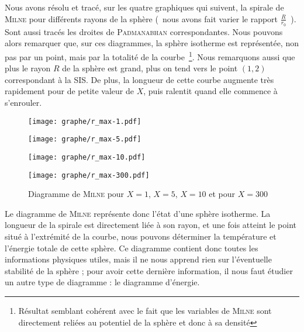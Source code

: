 	Nous avons résolu et tracé, sur les quatre graphiques qui suivent, la spirale de \textsc{Milne} pour différents rayons de la sphère (~nous avons fait varier le rapport $\frac{R}{r_0}$~).
	Sont aussi tracés les droites de \textsc{Padmanabhan} correspondantes.
	Nous pouvons alors remarquer que, sur ces diagrammes, la sphère isotherme est représentée, non pas par un point, mais par la totalité de la courbe~\footnote{Résultat semblant cohérent avec le fait que les variables de \textsc{Milne} sont directement reliées au potentiel de la sphère et donc à sa densité}.
	Nous remarquons aussi que plus le rayon $R$ de la sphère est grand, plus on tend vers le point $(1,2)$ correspondant à la SIS.
	De plus, la longueur de cette courbe augmente très rapidement pour de petite valeur de $X$, puis ralentit quand elle commence à s'enrouler.
	\begin{figure}[h!]
		\begin{minipage}[b]{0.40\linewidth}
			\centering \texttt{[image: graphe/r\_max-1.pdf]}
		\end{minipage}\hfill
		\begin{minipage}[b]{0.48\linewidth}
			\centering \texttt{[image: graphe/r\_max-5.pdf]}
		\end{minipage}
		\begin{minipage}[b]{0.40\linewidth}
			\centering \texttt{[image: graphe/r\_max-10.pdf]}
		\end{minipage}\hfill
		\begin{minipage}[b]{0.48\linewidth}
			\centering \texttt{[image: graphe/r\_max-300.pdf]}
		\end{minipage}
		\caption{Diagramme de \textsc{Milne} pour $X=1$, $X=5$, $X=10$ et pour $X=300$}
		\label{Milne}
	\end{figure}

	Le diagramme de \textsc{Milne} représente donc l'état d'une sphère isotherme. La longueur de la spirale est directement liée à son rayon, et une fois atteint le point situé à l'extrémité de la courbe,
	nous pouvons déterminer la température et l'énergie totale de cette sphère. Ce diagramme contient donc toutes les informations physiques utiles, mais il
	ne nous apprend rien sur l'éventuelle stabilité de la sphère ; pour avoir cette dernière information, il nous faut étudier un autre type de diagramme : le diagramme d'énergie.
